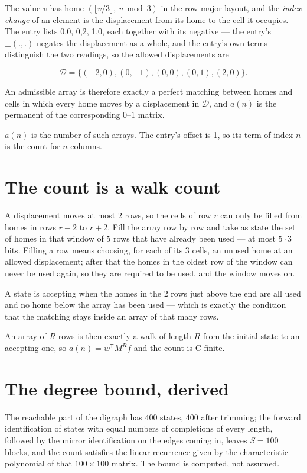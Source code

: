 \documentclass[11pt]{article}
\theoremstyle{definition}
\begin{document}
The value $v$ has home $(\lfloor v/3\rfloor,\ v \bmod 3)$ in the row-major layout, and the {\itshape index change} of an element is the displacement from its home to the cell it occupies. The entry lists 0,0, 0,2, 1,0, each together with its negative --- the entry's $\pm(.,.)$ negates the displacement as a whole, and the entry's own terms distinguish the two readings, so the allowed displacements are

\[\mathcal{D} = \{(-2,0), (0,-1), (0,0), (0,1), (2,0)\}.\]

An admissible array is therefore exactly a perfect matching between homes and cells in which every home moves by a displacement in $\mathcal{D}$, and $a(n)$ is the permanent of the corresponding $0$--$1$ matrix.

$a(n)$ is the number of such arrays. The entry's offset is 1, so its term of index $n$ is the count for $n$ columns.

\section{The count is a walk count}

A displacement moves at most $2$ rows, so the cells of row $r$ can only be filled from homes in rows $r-2$ to $r+2$. Fill the array row by row and take as state the set of homes in that window of $5$ rows that have already been used --- at most $5\cdot3$ bits. Filling a row means choosing, for each of its $3$ cells, an unused home at an allowed displacement; after that the homes in the oldest row of the window can never be used again, so they are required to be used, and the window moves on.

A state is accepting when the homes in the $2$ rows just above the end are all used and no home below the array has been used --- which is exactly the condition that the matching stays inside an array of that many rows.

An array of $R$ rows is then exactly a walk of length $R$ from the initial state to an accepting one, so $a(n) = w^{\mathsf T}M^{R}f$ and the count is C-finite.

\section{The degree bound, derived}

The reachable part of the digraph has $400$ states, $400$ after trimming; the forward identification of states with equal numbers of completions of every length, followed by the mirror identification on the edges coming in, leaves $S = 100$ blocks, and the count satisfies the linear recurrence given by the characteristic polynomial of that $100\times100$ matrix. The bound is computed, not assumed.
\end{document}
